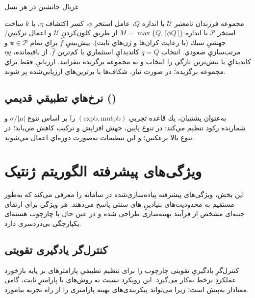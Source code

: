 \begin{algorithm}[H]
\caption{غربال جانشين در هر نسل}
\begin{algorithmic}[1]
\REQUIRE مجموعه فرزندان نامعتبر \(\mathcal{U}\) با اندازه \(Q\)، عامل استخر \(\phi\)، كسر اكتشاف \(\eta\)،  با \(k\)
\STATE ساخت استخر \(\mathcal{P}\) با اندازه \(M=\max\{Q,\lceil\phi Q\rceil\}\) از طريق كلون‌كردنِ \(\mathcal{U}\) و اعمال تركيبي/جهشيِ سبك (با رعايت كران‌ها و ژن‌هاي ثابت).
\STATE پيش‌بينيِ \(\hat f\) براي تمام \(\mathbf{x}\in\mathcal{P}\) و مرتب‌سازيِ صعودي.
\STATE انتخاب \(q=Q\) كانديدايِ استثماري با كم‌ترين \(\hat f\).
\STATE از باقيمانده، \(\eta q\) كانديدايِ با بيش‌ترين تازگي را انتخاب و به مجموعه برگزيده بيفزاييد.
\STATE ارزيابيِ  فقط براي مجموعه برگزيده؛ در صورت نياز، شكاف‌ها با برترين‌هاي ارزيابي‌شده پر شوند.
\end{algorithmic}
\end{algorithm}

\subsection{نرخ‌هاي تطبيقي قديمي ()}

به‌عنوان پشتيبان، يك قاعده تجربي \((\text{cxpb},\text{mutpb})\) را بر اساس تنوع \(\sigma/|\mu|\) و شمارنده ركود تنظيم مي‌كند: در تنوع پايين، جهش افزايش و تركيب كاهش مي‌يابد؛ در تنوع بالا برعكس؛ و اين تنظيمات به‌صورت دوره‌اي اعمال مي‌شوند.



\section{ویژگی‌های پیشرفته الگوریتم ژنتیک}

این بخش، ویژگی‌های پیشرفته پیاده‌سازی‌شده در سامانه  را معرفی می‌کند که به‌طور مستقیم به محدودیت‌های بنیادینِ ‌های سنتی پاسخ می‌دهند. هر ویژگی برای ارتقای جنبه‌ای مشخص از فرآیند بهینه‌سازی طراحی شده و در عین حال با چارچوب هسته‌ای  یکپارچگی بی‌دردسری دارد.

\subsection{کنترل‌گر یادگیری تقویتی}

کنترل‌گرِ یادگیریِ تقویتی چارچوب  را برای تنظیم تطبیقیِ پارامترهای  بر پایه بازخورد عملکردِ برخط به‌کار می‌گیرد. این رویکرد نسبت به روش‌های با پارامترِ ثابت، گامی معنادار به‌پیش است؛ زیرا  می‌تواند پیکربندی‌های بهینه پارامتری را از راه تجربه بیاموزد.

